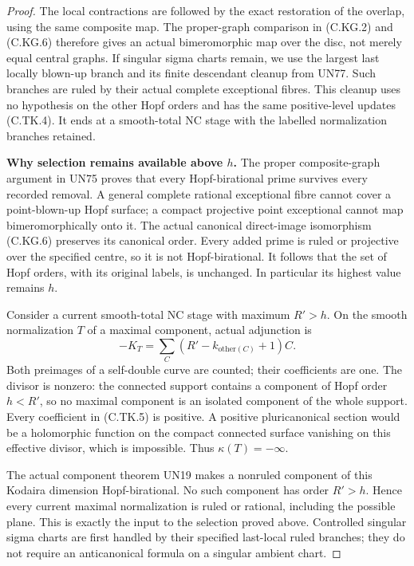 \begin{proof}
The local contractions are followed by the exact
restoration of the overlap, using the same composite
map. The proper-graph comparison in (C.KG.2) and
(C.KG.6) therefore gives an actual bimeromorphic
map over the disc, not merely equal central graphs.
If singular sigma charts remain, we use the
largest last locally blown-up branch and its finite
descendant cleanup from UN77. Such branches are
ruled by their actual complete exceptional fibres.
This cleanup uses no hypothesis on the other
Hopf orders and has the same positive-level updates
(C.TK.4). It ends at a smooth-total NC stage with
the labelled normalization branches retained.

\par\medskip\noindent\textbf{Why selection remains available above \(h\).}
The proper composite-graph argument in UN75 proves
that every Hopf-birational prime survives every
recorded removal. A general complete rational
exceptional fibre cannot cover a point-blown-up
Hopf surface; a compact projective point exceptional
cannot map bimeromorphically onto it. The actual
canonical direct-image isomorphism (C.KG.6) preserves
its canonical order. Every added prime is ruled or
projective over the specified centre, so it is not
Hopf-birational. It follows that the set of Hopf
orders, with its original labels, is unchanged.
In particular its highest value remains \(h\).

Consider a current smooth-total NC stage with
maximum \(R'>h\). On the smooth normalization
\(T\) of a maximal component, actual adjunction is
\[
       -K_T=\sum_C (R'-k_{\mathrm{other}(C)}+1)C.
 \tag{C.TK.5}
\]
Both preimages of a self-double curve are counted;
their coefficients are one. The divisor is nonzero:
the connected support contains a component of Hopf
order \(h<R'\), so no maximal component is an
isolated component of the whole support. Every
coefficient in (C.TK.5) is positive. A positive
pluricanonical section would be a holomorphic
function on the compact connected surface vanishing
on this effective divisor, which is impossible.
Thus \(\kappa(T)=-\infty\).

The actual component theorem UN19 makes a
nonruled component of this Kodaira dimension
Hopf-birational. No such component has order
\(R'>h\). Hence every current maximal
normalization is ruled or rational, including
the possible plane. This is exactly the input
to the selection proved above. Controlled
singular sigma charts are first handled by
their specified last-local ruled branches;
they do not require an anticanonical formula
on a singular ambient chart.


\end{proof}
